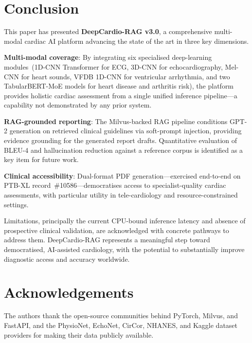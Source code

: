 \documentclass[AMA,STIX1COL,]{WileyNJD-v2}
\begin{document}
\section{Conclusion}
\label{sec:conclusion}

This paper has presented \textbf{DeepCardio-RAG v3.0}, a comprehensive
multi-modal cardiac AI platform advancing the state of the art in three
key dimensions.

\textbf{Multi-modal coverage}: By integrating six specialised
deep-learning modules~(1D-CNN Transformer for ECG, 3D-CNN for
echocardiography, Mel-CNN for heart sounds, VFDB 1D-CNN for ventricular
arrhythmia, and two TabularBERT-MoE models for heart disease and
arthritis risk), the platform provides holistic cardiac assessment from
a single unified inference pipeline---a capability not demonstrated by
any prior system.

\textbf{RAG-grounded reporting}: The Milvus-backed RAG pipeline
conditions GPT-2 generation on retrieved clinical guidelines via
soft-prompt injection, providing evidence grounding for the generated
report drafts. Quantitative evaluation of BLEU-4 and hallucination
reduction against a reference corpus is identified as a key item
for future work.

\textbf{Clinical accessibility}: Dual-format PDF generation---exercised
end-to-end on PTB-XL record~\#10586---democratises
access to specialist-quality cardiac assessments, with particular
utility in tele-cardiology and resource-constrained settings.

Limitations, principally the current CPU-bound inference latency and
absence of prospective clinical validation, are acknowledged with
concrete pathways to address them. DeepCardio-RAG represents a
meaningful step toward democratised, AI-assisted cardiology, with the
potential to substantially improve diagnostic access and accuracy
worldwide.

\section*{Acknowledgements}

The authors thank the open-source communities behind PyTorch, Milvus, and FastAPI, and the PhysioNet, EchoNet, CirCor, NHANES, and Kaggle dataset providers for making their data publicly available.
\end{document}
